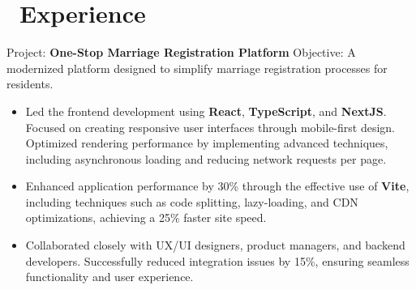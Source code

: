\documentclass{resume}
\begin{document}
\onehalfspacing
{}



\section{\faUsers\ Experience}
\role{Software Developer}

Project: \textbf{One-Stop Marriage Registration Platform}
Objective: A modernized platform designed to simplify marriage registration processes for residents.
\begin{itemize}
  \item Led the frontend development using \textbf{React}, \textbf{TypeScript}, and \textbf{NextJS}. Focused on creating responsive user interfaces through mobile-first design. Optimized rendering performance by implementing advanced techniques, including asynchronous loading and reducing network requests per page.
  \item Enhanced application performance by 30\% through the effective use of \textbf{Vite}, including techniques such as code splitting, lazy-loading, and CDN optimizations, achieving a 25\% faster site speed.
  \item Collaborated closely with UX/UI designers, product managers, and backend developers. Successfully reduced integration issues by 15\%, ensuring seamless functionality and user experience.
\end{itemize}
\end{document}
